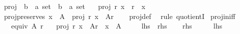 \begin{isabellebody}
\isamarkupfalse%
%
\endisatagproof
{\isafoldproof}%
%
\isadelimproof
%
\endisadelimproof
%
\isadelimdocument
%
\endisadelimdocument
%
\isatagdocument
%
\isamarkuptrue%
%
\endisatagdocument
{\isafolddocument}%
%
\isadelimdocument
%
\endisadelimdocument
{}\isamarkupfalse%
\ proj\ {\isacharcolon}{\kern0pt}{\isacharcolon}{\kern0pt}\ {\isachardoublequoteopen}{\isacharparenleft}{\kern0pt}{\isacharprime}{\kern0pt}b\ {\isasymtimes}\ {\isacharprime}{\kern0pt}a{\isacharparenright}{\kern0pt}\ set\ {\isasymRightarrow}\ {\isacharprime}{\kern0pt}b\ {\isasymRightarrow}\ {\isacharprime}{\kern0pt}a\ set{\isachardoublequoteclose}\isanewline
\ \ \ {\isachardoublequoteopen}proj\ r\ x\ {\isacharequal}{\kern0pt}\ r\ {\isacharbackquote}{\kern0pt}{\isacharbackquote}{\kern0pt}\ {\isacharbraceleft}{\kern0pt}x{\isacharbraceright}{\kern0pt}{\isachardoublequoteclose}\isanewline
\isanewline
{}\isamarkupfalse%
\ proj{\isacharunderscore}{\kern0pt}preserves{\isacharcolon}{\kern0pt}\ {\isachardoublequoteopen}x\ {\isasymin}\ A\ {\isasymLongrightarrow}\ proj\ r\ x\ {\isasymin}\ A{\isacharslash}{\kern0pt}{\isacharslash}{\kern0pt}r{\isachardoublequoteclose}\isanewline
%
\isadelimproof
\ \ %
\endisadelimproof
%
\isatagproof
{}\isamarkupfalse%
\ proj{\isacharunderscore}{\kern0pt}def\ \isamarkupfalse%
\ {\isacharparenleft}{\kern0pt}rule\ quotientI{\isacharparenright}{\kern0pt}%
\endisatagproof
{\isafoldproof}%
%
\isadelimproof
\isanewline
%
\endisadelimproof
\isanewline
{}\isamarkupfalse%
\ proj{\isacharunderscore}{\kern0pt}in{\isacharunderscore}{\kern0pt}iff{\isacharcolon}{\kern0pt}\isanewline
\ \ \ {\isachardoublequoteopen}equiv\ A\ r{\isachardoublequoteclose}\isanewline
\ \ \ {\isachardoublequoteopen}proj\ r\ x\ {\isasymin}\ A{\isacharslash}{\kern0pt}{\isacharslash}{\kern0pt}r\ {\isasymlongleftrightarrow}\ x\ {\isasymin}\ A{\isachardoublequoteclose}\isanewline
\ \ \ \ {\isacharparenleft}{\kern0pt}\ {\isachardoublequoteopen}{\isacharquery}{\kern0pt}lhs\ {\isasymlongleftrightarrow}\ {\isacharquery}{\kern0pt}rhs{\isachardoublequoteclose}{\isacharparenright}{\kern0pt}\isanewline
%
\isadelimproof
%
\endisadelimproof
%
\isatagproof
{}\isamarkupfalse%
\isanewline
\ \ \isamarkupfalse%
\ {\isacharquery}{\kern0pt}rhs\isanewline
\ \ \isamarkupfalse%
\ \isamarkupfalse%
\ {\isacharquery}{\kern0pt}lhs\ \isamarkupfalse%

\end{isabellebody}
